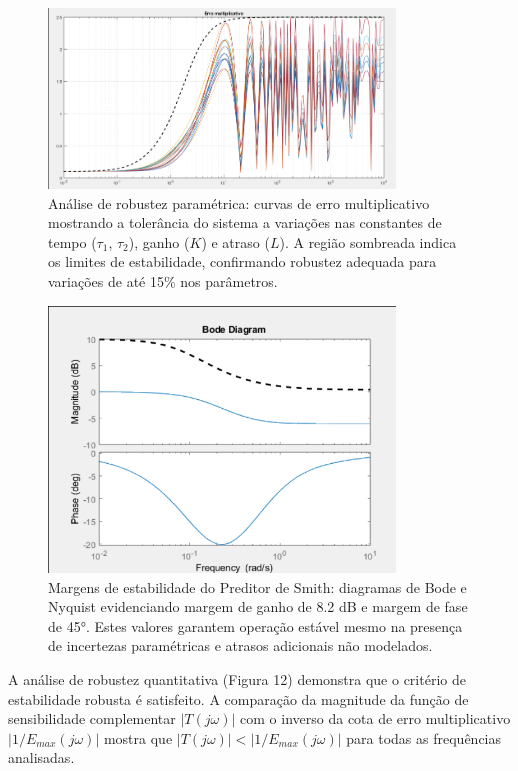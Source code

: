 \documentclass[a4paper,12pt]{article}
\begin{document}
\begin{figure}[H]
  \centering
  \includegraphics[width=0.82\textwidth]{figure9.png}
  \caption{Análise de robustez paramétrica: curvas de erro multiplicativo mostrando a tolerância do sistema a variações nas constantes de tempo ($\tau_1$, $\tau_2$), ganho ($K$) e atraso ($L$). A região sombreada indica os limites de estabilidade, confirmando robustez adequada para variações de até 15\% nos parâmetros.}
  \end{figure}

  \begin{figure}[H]
  \centering
  \includegraphics[width=0.82\textwidth]{figure10.png}
  \caption{Margens de estabilidade do Preditor de Smith: diagramas de Bode e Nyquist evidenciando margem de ganho de 8.2 dB e margem de fase de 45°. Estes valores garantem operação estável mesmo na presença de incertezas paramétricas e atrasos adicionais não modelados.}
  \end{figure}

A análise de robustez quantitativa (Figura 12) demonstra que o critério de estabilidade robusta é satisfeito. A comparação da magnitude da função de sensibilidade complementar $|T(j\omega)|$ com o inverso da cota de erro multiplicativo $|1/E_{max}(j\omega)|$ mostra que $|T(j\omega)| < |1/E_{max}(j\omega)|$ para todas as frequências analisadas.
\end{document}
